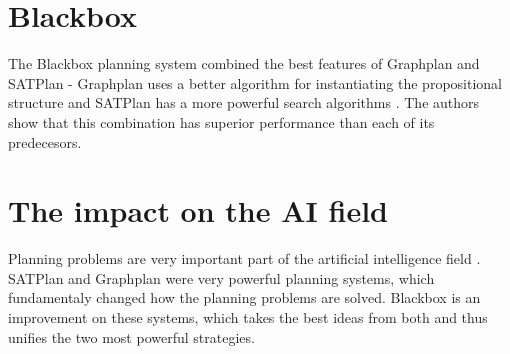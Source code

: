 \documentclass[11pt]{article}
\begin{document}
  \section{Blackbox}
  
  The Blackbox planning system combined the best features of Graphplan and SATPlan - Graphplan uses a better algorithm for instantiating the propositional structure and SATPlan has a more powerful search algorithms \autocite{kautz1999unifying}. The authors show that this combination has superior performance than each of its predecesors.
  
  \section{The impact on the AI field}
  
  Planning problems are very important part of the artificial intelligence field \autocite{russell2010artificial}. SATPlan and Graphplan were very powerful planning systems, which fundamentaly changed how the planning problems are solved. Blackbox is an improvement on these systems, which takes the best ideas from both and thus unifies the two most powerful strategies.
  
  \printbibliography

  
\end{document}
